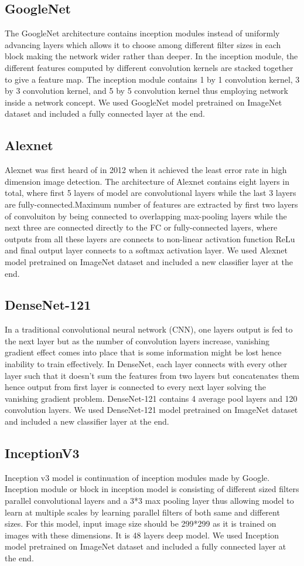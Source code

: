 \documentclass{ieeeaccess}
\begin{document}
\subsection{GoogleNet}
The GoogleNet architecture contains inception modules instead of uniformly advancing layers which allows it to choose among different filter sizes in each block making the network wider rather than deeper. In the inception module, the different features computed by different convolution kernels are stacked together to give a feature map. The inception module contains 1 by 1 convolution kernel, 3 by 3 convolution kernel, and 5 by 5 convolution kernel thus employing network inside a network concept. We used GoogleNet model pretrained on ImageNet dataset and included a fully connected layer at the end.
\subsection{Alexnet}
Alexnet was first heard of in 2012 when it achieved the least error rate in high dimension image detection. The architecture of Alexnet contains eight layers in total, where first 5 layers of model are convolutional layers while the last 3  layers are fully-connected.Maximum number of features are extracted by first two layers of convoluiton by being connected to overlapping max-pooling layers while the next three are connected directly to the FC or fully-connected layers, where outputs from all these layers are connects to non-linear activation function ReLu and final output layer connects to a softmax activation layer. We used Alexnet model pretrained on ImageNet dataset and included a new classifier layer at the end.
\subsection{DenseNet-121}
In a traditional convolutional neural network (CNN), one layers output is fed to the next layer but as the number of convolution layers increase, vanishing gradient effect comes into place that is some information might be lost hence inability to train effectively. In DenseNet, each layer connects with every other layer such that it doesn’t sum the features from two layers but concatenates them hence output from first layer is connected to every next layer solving the vanishing gradient problem. DenseNet-121 contains 4 average pool layers and 120 convolution layers. We used DenseNet-121 model pretrained on ImageNet dataset and included a new classifier layer at the end.
\subsection{InceptionV3}
Inception v3 model is continuation of inception modules made by Google. Inception module or block in inception model is consisting of different sized filters parallel convolutional layers and a 3*3 max pooling layer thus allowing model to learn at multiple scales by learning parallel filters of both same and different sizes. For this model, input image size should be 299*299 as it is trained on images with these dimensions. It is 48 layers deep model. We used Inception model pretrained on ImageNet dataset and included a fully connected layer at the end.
\end{document}
